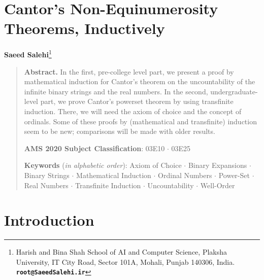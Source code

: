 \documentclass[12pt]{article}
\begin{document}
\section*{Cantor's Non-Equinumerosity Theorems, Inductively}
\vspace{-.30cm}

\begin{center}
\textbf{Saeed Salehi}\footnote{%
Harish and Bina Shah School of AI and Computer Science, Plaksha University, IT City Road, Sector 101A, Mohali, Punjab 140306, India. \textbf{\texttt{root@SaeedSalehi.ir}}}
\end{center}

\begin{quote}{\small
\textbf{Abstract.}
In the first, pre-college level part, we present a proof by mathematical induction for Cantor’s theorem on the uncountability of the infinite binary strings and the real numbers. In the second, undergraduate-level part, we prove Cantor’s powerset theorem by using transfinite induction. There, we will need the axiom of choice and the concept of ordinals. Some of these proofs by (mathematical and transfinite) induction seem to be new; comparisons will be made with older results.

{\bf AMS 2020 Subject Classification}:
  03E10 %
   $\cdot$
 03E25%

   {\bf Keywords} ({\sl in alphabetic order}):
  Axiom of Choice $\cdot$
      Binary Expansions $\cdot$
  Binary Strings $\cdot$
    Mathematical Induction  $\cdot$
    Ordinal Numbers $\cdot$
    Power-Set $\cdot$
 Real Numbers $\cdot$
   Transfinite Induction $\cdot$
   Uncountability $\cdot$
  Well-Order
 }\end{quote}





\section{Introduction}
\label{sec:intro}
\end{document}
